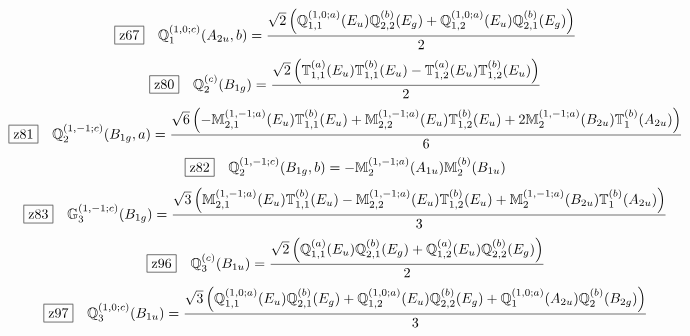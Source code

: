 \documentclass[fleqn,10pt,landscape]{jsarticle}
\begin{document}
\begin{dmath*}
\hspace*{3mm}\fbox{z67}\quad \mathbb{Q}_{1}^{(1,0;c)}(A_{2u},b)=\frac{\sqrt{2} \left(\mathbb{Q}_{1,1}^{(1,0;a)}(E_{u}) \mathbb{Q}_{2,2}^{(b)}(E_{g}) + \mathbb{Q}_{1,2}^{(1,0;a)}(E_{u}) \mathbb{Q}_{2,1}^{(b)}(E_{g})\right)}{2}
\end{dmath*}
\begin{dmath*}
\hspace*{3mm}\fbox{z80}\quad \mathbb{Q}_{2}^{(c)}(B_{1g})=\frac{\sqrt{2} \left(\mathbb{T}_{1,1}^{(a)}(E_{u}) \mathbb{T}_{1,1}^{(b)}(E_{u}) - \mathbb{T}_{1,2}^{(a)}(E_{u}) \mathbb{T}_{1,2}^{(b)}(E_{u})\right)}{2}
\end{dmath*}
\begin{dmath*}
\hspace*{3mm}\fbox{z81}\quad \mathbb{Q}_{2}^{(1,-1;c)}(B_{1g},a)=\frac{\sqrt{6} \left(- \mathbb{M}_{2,1}^{(1,-1;a)}(E_{u}) \mathbb{T}_{1,1}^{(b)}(E_{u}) + \mathbb{M}_{2,2}^{(1,-1;a)}(E_{u}) \mathbb{T}_{1,2}^{(b)}(E_{u}) + 2 \mathbb{M}_{2}^{(1,-1;a)}(B_{2u}) \mathbb{T}_{1}^{(b)}(A_{2u})\right)}{6}
\end{dmath*}
\begin{dmath*}
\hspace*{3mm}\fbox{z82}\quad \mathbb{Q}_{2}^{(1,-1;c)}(B_{1g},b)=- \mathbb{M}_{2}^{(1,-1;a)}(A_{1u}) \mathbb{M}_{2}^{(b)}(B_{1u})
\end{dmath*}
\begin{dmath*}
\hspace*{3mm}\fbox{z83}\quad \mathbb{G}_{3}^{(1,-1;c)}(B_{1g})=\frac{\sqrt{3} \left(\mathbb{M}_{2,1}^{(1,-1;a)}(E_{u}) \mathbb{T}_{1,1}^{(b)}(E_{u}) - \mathbb{M}_{2,2}^{(1,-1;a)}(E_{u}) \mathbb{T}_{1,2}^{(b)}(E_{u}) + \mathbb{M}_{2}^{(1,-1;a)}(B_{2u}) \mathbb{T}_{1}^{(b)}(A_{2u})\right)}{3}
\end{dmath*}
\begin{dmath*}
\hspace*{3mm}\fbox{z96}\quad \mathbb{Q}_{3}^{(c)}(B_{1u})=\frac{\sqrt{2} \left(\mathbb{Q}_{1,1}^{(a)}(E_{u}) \mathbb{Q}_{2,1}^{(b)}(E_{g}) + \mathbb{Q}_{1,2}^{(a)}(E_{u}) \mathbb{Q}_{2,2}^{(b)}(E_{g})\right)}{2}
\end{dmath*}
\begin{dmath*}
\hspace*{3mm}\fbox{z97}\quad \mathbb{Q}_{3}^{(1,0;c)}(B_{1u})=\frac{\sqrt{3} \left(\mathbb{Q}_{1,1}^{(1,0;a)}(E_{u}) \mathbb{Q}_{2,1}^{(b)}(E_{g}) + \mathbb{Q}_{1,2}^{(1,0;a)}(E_{u}) \mathbb{Q}_{2,2}^{(b)}(E_{g}) + \mathbb{Q}_{1}^{(1,0;a)}(A_{2u}) \mathbb{Q}_{2}^{(b)}(B_{2g})\right)}{3}
\end{dmath*}
\end{document}
